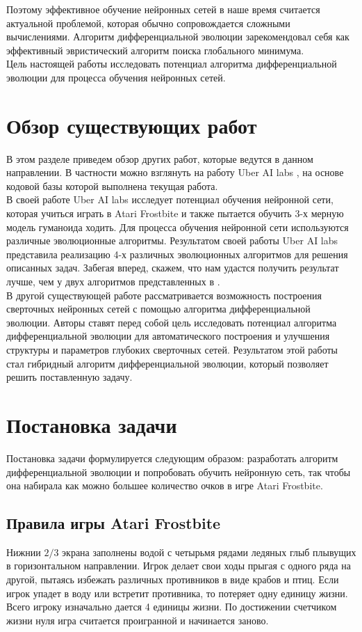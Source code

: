 \documentclass[12pt]{article}
\begin{document}
    Поэтому эффективное обучение нейронных сетей в наше время считается актуальной проблемой, которая обычно сопровождается сложными вычислениями. Алгоритм дифференциальной эволюции зарекомендовал себя как эффективный эвристический алгоритм поиска глобального минимума. \\
    
    Цель настоящей работы исследовать потенциал алгоритма дифференциальной эволюции для процесса обучения нейронных сетей. 

\section{Обзор существующих работ}
    В этом разделе приведем обзор других работ, которые ведутся в данном направлении. В частности можно взглянуть на работу Uber AI labs \cite{uber}, на основе кодовой базы которой выполнена текущая работа. \\

    В своей работе Uber AI labs исследует потенциал обучения нейронной сети, которая учиться играть в Atari Frostbite и также пытается обучить 3-х мерную модель гуманоида ходить. Для процесса обучения нейронной сети используются различные эволюционные алгоритмы. Результатом своей работы Uber AI labs представила реализацию 4-х различных эволюционных алгоритмов для решения описанных задач. Забегая вперед, скажем, что нам удастся получить результат лучше, чем у двух алгоритмов представленных в \cite{uber}. \\

    В другой существующей работе \cite{de-for-cnn-design} рассматривается возможность построения сверточных нейронных сетей с помощью алгоритма дифференциальной эволюции. Авторы ставят перед собой цель исследовать потенциал алгоритма дифференциальной эволюции для автоматического построения и улучшения структуры и параметров глубоких сверточных сетей. Результатом этой работы стал гибридный алгоритм дифференциальной эволюции, который позволяет решить поставленную задачу.

\section{Постановка задачи}
    Постановка задачи формулируется следующим образом: разработать алгоритм дифференциальной эволюции и попробовать обучить нейронную сеть, так чтобы она набирала как можно большее количество очков в игре Atari Frostbite.

    \subsection{Правила игры Atari Frostbite}
    Нижнии $2/3$ экрана заполнены водой с четырьмя рядами ледяных глыб плывущих в горизонтальном направлении. Игрок делает свои ходы прыгая с одного ряда на другой, пытаясь избежать различных противников в виде крабов и птиц. Если игрок упадет в воду или встретит противника, то потеряет одну единицу жизни. Всего игроку изначально дается 4 единицы жизни. По достижении счетчиком жизни нуля игра считается проигранной и начинается заново.  \\
\end{document}
